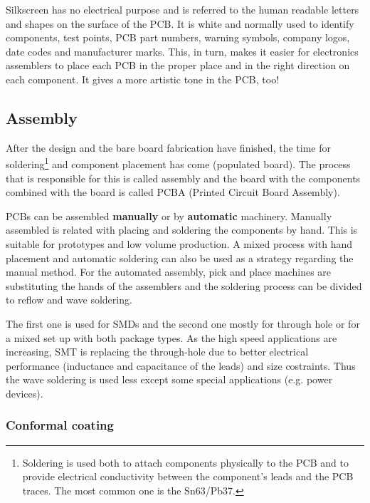 \documentclass[final]{cubedoc}
\begin{document}
	Silkscreen has no electrical purpose and is referred to the human readable letters and shapes on the surface of the PCB. It is white and normally used to identify components, test points, PCB part numbers, warning symbols, company logos, date codes and manufacturer marks. This, in turn, makes it easier for electronics assemblers to place each PCB in the proper place and in the right direction on each component. It gives a more artistic tone in the PCB, too!
	
	
	\subsection{Assembly}
	
	After the design and the bare board fabrication have finished, the time for soldering\footnote{Soldering is used both to attach components physically to the PCB and to provide electrical conductivity between the component’s leads and the PCB traces. The most common one is the Sn63/Pb37.} and component placement has come (populated board). The process that is responsible for this is called assembly and the board with the components combined with the board is called PCBA (Printed Circuit Board Assembly).
	
	PCBs can be assembled \textbf{manually} or by \textbf{automatic} machinery. Manually assembled is related with placing and soldering the components by hand. This is suitable for prototypes and low volume production. A mixed process with hand placement and automatic soldering can also be used as a strategy regarding the manual method. For the automated assembly, pick and place machines are substituting the hands of the assemblers and the soldering process can be divided to reflow and wave soldering. 
	
	The first one is used for SMDs and the second one mostly for through hole or for a mixed set up with both package types. 
	As the high speed applications are increasing, SMT is replacing the through-hole due to better electrical performance (inductance and capacitance of the leads) and size costraints. Thus the wave soldering is used less except some special applications (e.g. power devices).
	
	\subsubsection{Conformal coating}
	
\end{document}
